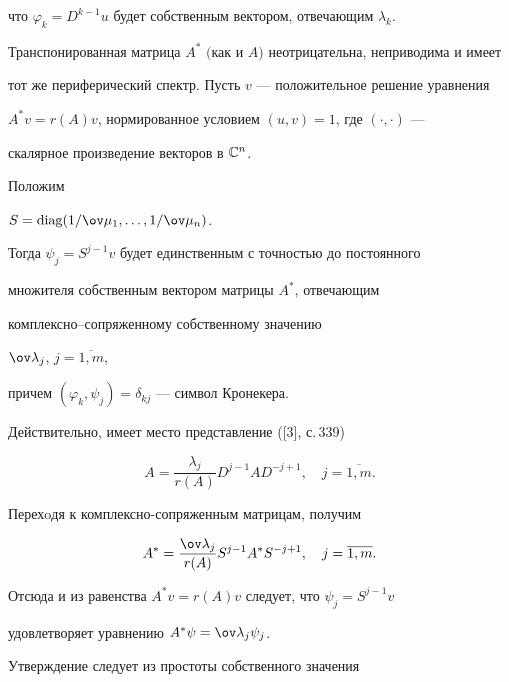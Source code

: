 что $\varphi_k = D^{k-1}u$ будет собственным вектором, отвечающим $\lambda_k$.





\begin{assrt}


Транспонированная матрица $A^*$ $($как и $A)$ неотрицательна, неприводима и имеет


тот же периферический спектр. Пусть $v$ --- положительное решение уравнения


$A^* v = r(A) v$, нормированное условием $(u,v) = 1$, где $(\cdot,\cdot)$ ---


скалярное произведение векторов в $\Bbb C^n$.


Положим


$S = \diag(1/\ov\mu_1,\dotsc,1/\ov\mu_n)$.


Тогда $\psi_j = S^{j-1}v$ будет единственным с точностью до постоянного


множителя собственным вектором матрицы $A^*$, отвечающим 


комплексно--сопряженному собственному значению 


$\ov\lambda_j$, $j=\overline{1,m}$,


причем $(\varphi_k,\psi_j) = \delta_{kj}$ --- символ Кронекера.


\end{assrt}





Действительно, имеет место представление ([3], с.\,339)


\begin{equation}\label{2}


A =\frac{\lambda_j}{r(A)}D^{j-1}AD^{-j+1},\quad j = \overline{1,m}.


\end{equation}


Перехoдя к комплексно-сопряженным матрицам, получим


\begin{equation}\label{3}


A^* = \frac{\ov\lambda_j}{r(A)}S^{j-1}A^*S^{-j+1},\quad j = \overline{1,m}.


\end{equation}


Отсюда и из равенства $A^* v = r(A) v$ следует, что $\psi_j = S^{j-1} v$


удовлетворяет уравнению $A^* \psi = \ov\lambda_j \psi_j$.


Утверждение следует из простоты собственного значения 


